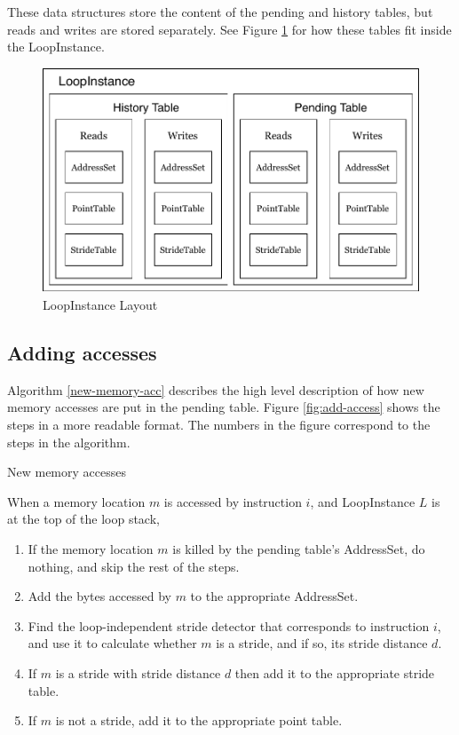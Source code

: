 \documentclass[12pt,twoside]{reedthesis}
\begin{document}
			
			These data structures store the content of the pending and history tables, but reads and writes are stored separately. See Figure \ref{fig:loopinstance} for how these tables fit inside the LoopInstance. 
			
			\begin{figure}[H]
				\caption{LoopInstance Layout}
				\label{fig:loopinstance}
				\includegraphics[scale=0.7]{loop-instance.pdf}
			\end{figure}
			
			
		\subsection{Adding accesses}\label{s:add-accesses}
		
		Algorithm \ref{new-memory-acc} describes the high level description of how new memory accesses are put in the pending table. Figure \ref{fig:add-access} shows the steps in a more readable format. The numbers in the figure correspond to the steps in the algorithm.%
		
		\begin{algorithm}
			\caption{New memory accesses}\label{new-memory-acc}
			When a memory location $m$ is accessed by instruction $i$, and LoopInstance $L$ is at the top of the loop stack,
			\begin{enumerate}
				\item If the memory location $m$ is killed by the pending table's AddressSet, do nothing, and skip the rest of the steps. 
				\item Add the bytes accessed by $m$ to the appropriate AddressSet.
				\item Find the loop-independent stride detector that corresponds to instruction $i$, and use it to calculate whether $m$ is a stride, and if so, its stride distance $d$. 
				\item If $m$ is a stride with stride distance $d$ then add it to the appropriate stride table.
				\item If $m$ is not a stride, add it to the appropriate point table. 
			\end{enumerate} 
		\end{algorithm}
	
\end{document}
